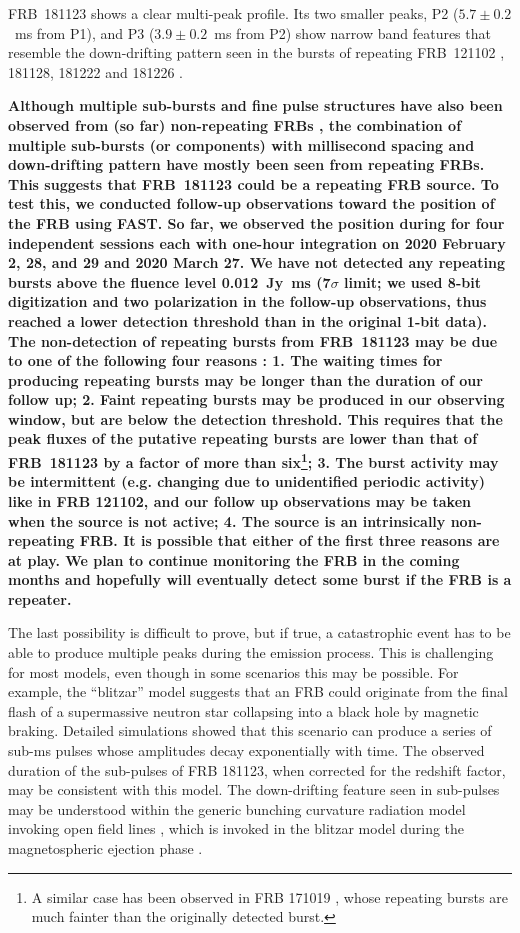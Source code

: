 FRB~181123 shows a clear multi-peak profile. Its two smaller peaks, P2 ($5.7\pm0.2$~ms from P1), and P3 ($3.9\pm0.2$~ms from P2) show narrow band features that resemble the down-drifting pattern seen in the bursts of repeating FRB~121102 \citep{gsp+18,hessels19}, 181128, 181222 and 181226 \citep{chime_8}. 
{\bf Although multiple sub-bursts and fine pulse structures have also been observed from (so far) non-repeating FRBs \citep{cpk+16,ffb+18,cms+20}, the combination of multiple sub-bursts (or components) with millisecond spacing
and down-drifting pattern have mostly been seen from repeating FRBs. This suggests that FRB~181123 could be a repeating FRB source. To test this, we conducted follow-up observations toward the position of the FRB using FAST. So far, we observed the position during for four independent sessions each with one-hour integration on 2020 February 2, 28, and 29 and 2020 March 27. We have not detected any repeating bursts above the fluence level 0.012~Jy~ms (7$\sigma$ limit; we used 8-bit digitization and two polarization in the follow-up observations, thus reached a lower detection threshold than in the original 1-bit data).  
The non-detection of repeating bursts from FRB~181123 may be due to one of the following four reasons \citep[e.g.][]{palaniswamy18}: 1. The waiting times for producing repeating bursts may be longer than the duration of our follow up; 2. Faint repeating bursts may be produced in our observing window, but are below the detection threshold. This requires that the peak fluxes of the putative repeating bursts are lower than that of FRB~181123 by a factor of more than six\footnote{A similar case has been observed in FRB 171019 \citep{kumar19}, whose repeating bursts are much fainter than the originally detected burst.}; 3. The burst activity may be intermittent (e.g. changing due to unidentified periodic activity) like in FRB 121102, and our follow up observations may be taken when the source is not active; 4. The source is an intrinsically non-repeating FRB. It is possible that either of the first three reasons are at play. We plan to continue monitoring the FRB in the coming months and hopefully will eventually detect some burst if the FRB is a repeater.


The last possibility is difficult to prove, but if true, a catastrophic event has to be able to produce multiple peaks during the emission process. This is challenging for most models, even though in some scenarios this may be possible. For example, the ``blitzar'' model \citep{fr14} suggests that an FRB could originate from the final flash of a supermassive neutron star collapsing into a black hole by magnetic braking. Detailed simulations \citep{most18} showed that this scenario can produce a series of sub-ms pulses whose amplitudes decay exponentially with time. The observed duration of the sub-pulses of FRB 181123, when corrected for the redshift factor, may be consistent with this model. The down-drifting feature seen in sub-pulses may be understood within the generic bunching curvature radiation model invoking open field lines \citep{wang19}, which is invoked in the blitzar model during the magnetospheric ejection phase \citep{most18}. 
}


